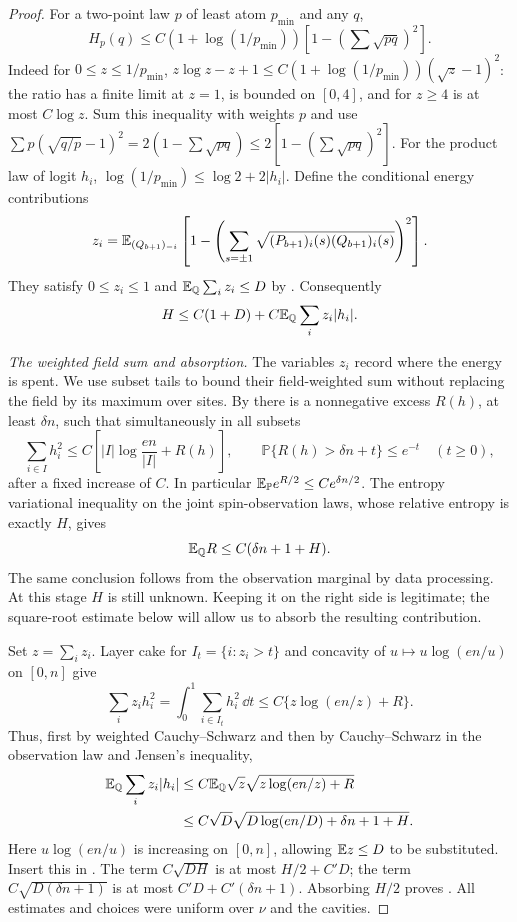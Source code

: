\begin{proof}
For a two-point law $p$ of least atom $p_{\min}$ and any $q$,
\begin{equation}\label{eq:stat-two-point}
 H_p(q)\le C(1+\log(1/p_{\min}))
       \left[1-\left(\sum\sqrt{pq}\right)^2\right].
\end{equation}
Indeed for $0\le z\le1/p_{\min}$,
$z\log z-z+1\le C(1+\log(1/p_{\min}))(\sqrt z-1)^2$:
the ratio has a finite limit at $z=1$, is bounded on $[0,4]$, and for
$z\ge4$ is at most $C\log z$.  Sum this inequality with weights $p$ and
use $\sum p(\sqrt{q/p}-1)^2=2(1-\sum\sqrt{pq})
\le2[1-(\sum\sqrt{pq})^2]$.
For the product law of logit $h_i$,
$\log(1/p_{\min})\le\log2+2|h_i|$.
Define the conditional energy contributions
\[
 z_i=\mathbb E_{(Q_{b+1})_{-i}}
  \left[1-\left(\sum_{s=\pm1}
   \sqrt{(P_{b+1})_i(s)(Q_{b+1})_i(s)}\right)^2\right].
\]
They satisfy $0\le z_i\le1$ and
$\mathbb E_{\mathbb Q}\sum_i z_i\le D$ by
.  Consequently
\begin{equation}\label{eq:stat-H-z}
 H\le C(1+D)+C\mathbb E_{\mathbb Q}\sum_i z_i|h_i|.
\end{equation}

\emph{The weighted field sum and absorption.}
The variables $z_i$ record where the energy is spent.  We use subset
tails to bound their field-weighted sum without replacing the field by
its maximum over sites.  By  there is a
nonnegative excess $R(h)$,
at least $\delta n$, such that simultaneously in all subsets
\[
 \sum_{i\in I}h_i^2\le C\left[|I|\log\frac{en}{|I|}+R(h)\right],
 \qquad \mathbb P\{R(h)>\delta n+t\}\le e^{-t}\quad(t\ge0),
\]
after a fixed increase of $C$.  In particular
$\mathbb E_{\mathbb P}e^{R/2}\le C e^{\delta n/2}$.
The entropy variational inequality on the joint spin-observation laws,
whose relative entropy is exactly $H$, gives
\begin{equation}\label{eq:stat-excess}
 \mathbb E_{\mathbb Q}R\le C(\delta n+1+H).
\end{equation}
The same conclusion follows from the observation marginal by data
processing.  At this stage $H$ is still unknown.  Keeping it on the right
side is legitimate; the square-root estimate below will allow us to absorb the
resulting contribution.

Set $z=\sum_i z_i$.  Layer cake for $I_t=\{i:z_i>t\}$ and concavity of
$u\mapsto u\log(en/u)$ on $[0,n]$ give
\[
 \sum_i z_i h_i^2
   =\int_0^1\sum_{i\in I_t}h_i^2\,\dd t
   \le C\{z\log(en/z)+R\}.
\]
Thus, first by weighted Cauchy--Schwarz and then by Cauchy--Schwarz in the
observation law and Jensen's inequality,
\begin{align*}
 \mathbb E_{\mathbb Q}\sum_i z_i|h_i|
 &\le C\mathbb E_{\mathbb Q}\sqrt z\sqrt{z\log(en/z)+R}\\
 &\le C\sqrt D\sqrt{D\log(en/D)+\delta n+1+H}.
\end{align*}
Here $u\log(en/u)$ is increasing on $[0,n]$, allowing
$\mathbb E z\le D$ to be substituted.  Insert this in
.  The term $C\sqrt{DH}$ is at most $H/2+C'D$;
the term $C\sqrt{D(\delta n+1)}$ is at most
$C'D+C'(\delta n+1)$.  Absorbing $H/2$ proves
.  All estimates and choices were uniform over
$\nu$ and the cavities.
\end{proof}

